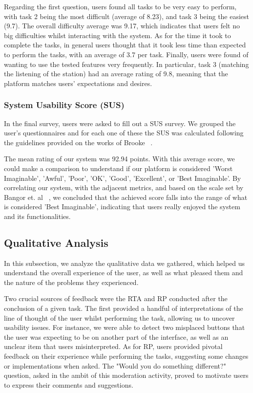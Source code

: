 {Regarding the first question, users found all tasks to be very easy to perform, with task 2 being the most difficult (average of 8.23), and task 3 being the easiest (9.7). The overall difficulty average was 9.17, which indicates that users felt no big difficulties whilst interacting with the system. As for the time it took to complete the tasks, in general users thought that it took less time than expected to perform the tasks, with an average of 3.7 per task. Finally, users were found of wanting to use the tested features very frequently. In particular, task 3 (matching the listening of the station) had an average rating of 9.8, meaning that the platform matches users' expectations and desires.

\subsubsection{System Usability Score (SUS)}

In the final survey, users were asked to fill out a \ac{SUS} survey. We grouped the user’s questionnaires and for each one of these the \ac{SUS} was calculated following the guidelines provided on the works of Brooke ~\cite{Kusic2018}.

The mean rating of our system was 92.94 points. With this average score, we could make a comparison to understand if our platform is considered 'Worst Imaginable', 'Awful', 'Poor', 'OK', 'Good', 'Excellent', or 'Best Imaginable'. By correlating our system, with the adjacent metrics, and based on the scale set by Bangor et. al ~\cite{Donovan2018}, we concluded that the achieved score falls into the range of what is considered 'Best Imaginable', indicating that users really enjoyed the system and its functionalities.


\subsection{Qualitative Analysis}

In this subsection, we analyze the qualitative data we gathered, which helped us understand the overall experience of the user, as well as what pleased them and the nature of the problems they experienced.

Two crucial sources of feedback were the \ac{RTA} and \ac{RP} conducted after the conclusion of a given task. The first provided a handful of interpretations of the line of thought of the user whilst performing the task, allowing us to uncover usability issues. For instance, we were able to detect two misplaced buttons that the user was expecting to be on another part of the interface, as well as an unclear item that users misinterpreted. As for \ac{RP}, users provided pivotal feedback on their experience while performing the tasks, suggesting some changes or implementations when asked. The "Would you do something different?" question, asked in the ambit of this moderation activity, proved to motivate users to express their comments and suggestions.

}
